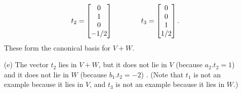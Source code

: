 \documentclass[a4paper]{article}
\begin{document}
\begin{solution}
\begin{itemize}
\[      t_2 = \left[\begin{matrix} 0 \\ 1 \\ 0 \\ -1/2 \end{matrix}\right] \hspace{4em}
      t_3 = \left[\begin{matrix} 0 \\ 0 \\ 1 \\ 1/2 \end{matrix}\right].
   \]
   These form the canonical basis for $V+W$. \mk
  \item[(e)] The vector $t_2$ lies in $V+W$, but it does not lie in
   $V$ (because $a_2.t_2=1$) and it does not lie in $W$ (because
   $b_1.t_2=-2$) .  (Note that $t_1$ is not an example because
   it lies in $V$, and $t_3$ is not an example because it lies in
   $W$.)    
 \end{itemize}
\end{solution}
\end{document}
